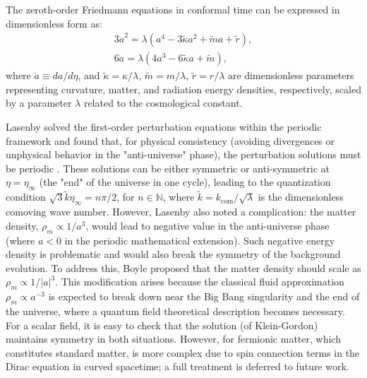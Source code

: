 \documentclass[%
 reprint,
 amsmath,amssymb,
 prd, %
]{revtex4-2}
\begin{document}
The zeroth-order Friedmann equations in conformal time can be expressed in dimensionless form as: %
\begin{equation}\label{eq:friedmann_eq}
\begin{aligned}
    3\dot{a}^2 = \lambda (a^4 - 3\tilde\kappa a^2  + \tilde ma+\tilde r), \\
    6\ddot{a} = \lambda(4a^3-6\tilde\kappa a+\tilde m),
\end{aligned}
\end{equation}
where $\dot{a} \equiv da/d\eta$, and $\tilde{\kappa} = \kappa/\lambda$, $\tilde{m} = m/\lambda$, $\tilde{r} = r/\lambda$ are dimensionless parameters representing curvature, matter, and radiation energy densities, respectively, scaled by a parameter $\lambda$ related to the cosmological constant. %

Lasenby solved the first-order perturbation equations within the periodic framework and found that, for physical consistency (avoiding divergences or unphysical behavior in the "anti-universe" phase), the perturbation solutions must be periodic \cite{2022PhRvD.105h3514L}. %
These solutions can be either symmetric or anti-symmetric at $\eta=\eta_\infty$ (the "end" of the universe in one cycle), leading to the quantization condition $\sqrt{3}\tilde k\eta_\infty=n\pi/2$, for $n \in \mathbb{N}$, where $\tilde k = k_{\mathrm{com}}/\sqrt{\lambda}$ is the dimensionless comoving wave number. %
However, Lasenby also noted a complication: the matter density, $\rho_m \propto 1/a^{3}$, would lead to negative value in the anti-universe phase (where $a<0$ in the periodic mathematical extension). %
Such negative energy density is problematic and would also break the symmetry of the background evolution. %
To address this, Boyle proposed that the matter density should scale as $\rho_m \propto 1/|a|^3$. This modification arises because the classical fluid approximation $\rho_m \propto a^{-3}$ is expected to break down near the Big Bang singularity and the end of the universe, where a quantum field theoretical description becomes necessary. For a scalar field, it is easy to check that the solution (of Klein-Gordon) maintains symmetry in both situations. %
However, for fermionic matter, which constitutes standard matter, is more complex due to spin connection terms in the Dirac equation in curved spacetime; a full treatment is deferred to future work. %
\end{document}
